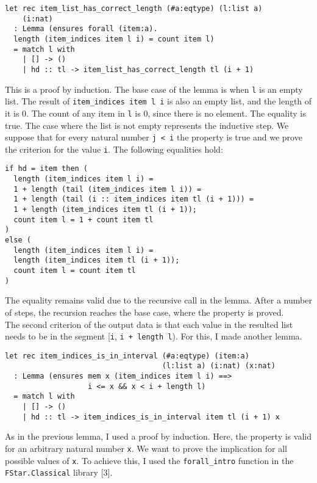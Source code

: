 \begin{verbatim}
let rec item_list_has_correct_length (#a:eqtype) (l:list a) 
    (i:nat) 
  : Lemma (ensures forall (item:a). 
  length (item_indices item l i) = count item l) 
  = match l with 
    | [] -> () 
    | hd :: tl -> item_list_has_correct_length tl (i + 1)
\end{verbatim}

This is a proof by induction. The base case of the lemma is when \texttt{l} is an empty list. The result of \texttt{item\_indices item l i} is also an empty list, and the length of it is \(0\). The count of any item in \texttt{l} is \(0\), since there is no element. The equality is true. The case where the list is not empty represents the inductive step. We suppose that for every natural number \texttt{j < i} the property is true and we prove the criterion for the value \texttt{i}. The following equalities hold:

\begin{verbatim}
if hd = item then ( 
  length (item_indices item l i) = 
  1 + length (tail (item_indices item l i)) = 
  1 + length (tail (i :: item_indices item tl (i + 1))) = 
  1 + length (item_indices item tl (i + 1)); 
  count item l = 1 + count item tl 
) 
else ( 
  length (item_indices item l i) = 
  length (item_indices item tl (i + 1)); 
  count item l = count item tl 
)
\end{verbatim}

The equality remains valid due to the recursive call in the lemma. After a number of steps, the recursion reaches the base case, where the property is proved. \\
\indent The second criterion of the output data is that each value in the resulted list needs to be in the segment [\texttt{i}, \texttt{i + length l}). For this, I made another lemma. 

\begin{verbatim}
let rec item_indices_is_in_interval (#a:eqtype) (item:a) 
                                    (l:list a) (i:nat) (x:nat) 
  : Lemma (ensures mem x (item_indices item l i) ==> 
                   i <= x && x < i + length l) 
  = match l with 
    | [] -> () 
    | hd :: tl -> item_indices_is_in_interval item tl (i + 1) x
\end{verbatim}

As in the previous lemma, I used a proof by induction. Here, the property is valid for an arbitrary natural number \texttt{x}. We want to prove the implication for all possible values of \texttt{x}. To achieve this, I used the \texttt{forall\_intro} function in the \texttt{FStar.Classical} library [\(3\)].

